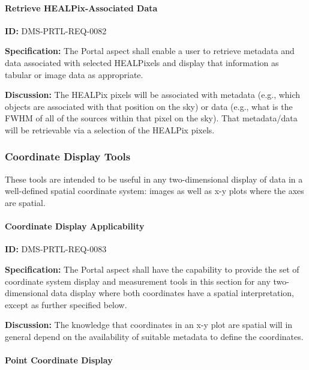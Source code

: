 \documentclass[SE,toc,lsstdraft]{lsstdoc}
\begin{document}
\paragraph{Retrieve HEALPix-Associated Data}\hfill  %

\label{DMS-PRTL-REQ-0082}
\textbf{ID:} DMS-PRTL-REQ-0082

\textbf{Specification:}
The Portal aspect shall enable a user to retrieve metadata and data associated with selected HEALPixels and display that information as tabular or image data as appropriate.

\textbf{Discussion:}
The HEALPix pixels will be associated with metadata (e.g., which objects are associated with that position on the sky) or data (e.g., what is the FWHM of all of the sources within that pixel on the sky).  That metadata/data will be retrievable via a selection of the HEALPix pixels.

\subsubsection{Coordinate Display Tools}

These tools are intended to be useful in any two-dimensional display of data in a well-defined spatial coordinate system: images as well as x-y plots where the axes are spatial.

\paragraph{Coordinate Display Applicability}\hfill  %

\label{DMS-PRTL-REQ-0083}
\textbf{ID:} DMS-PRTL-REQ-0083

\textbf{Specification:}
The Portal aspect shall have the capability to provide the set of coordinate system display and measurement tools in this section for any two-dimensional data display where both coordinates have a spatial interpretation, except as further specified below.

\textbf{Discussion:}
The knowledge that coordinates in an x-y plot are spatial will in general depend on the availability of suitable metadata to define the coordinates.

\paragraph{Point Coordinate Display}\hfill  %
\end{document}
